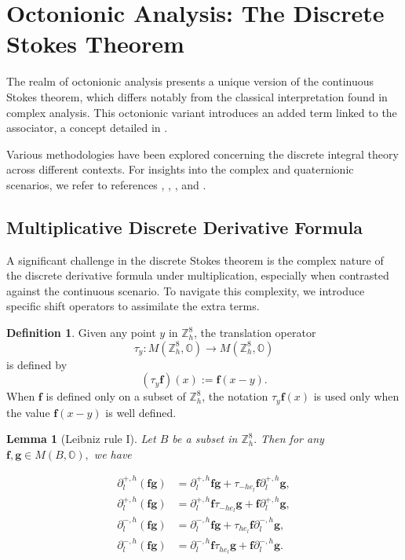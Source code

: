 \documentclass{amsart}
\newtheorem{lemma}[theorem]{Lemma}
\theoremstyle{definition}
\newtheorem{definition}[theorem]{Definition}
\theoremstyle{remark}
\numberwithin{equation}{section}
\newcommand{\p}{\partial}
\newcommand{\OO}{\mathbb O}
\newcommand{\Z}{\mathbb Z}
\newcommand{\f}{\bm{f}}
\newcommand{\g}{\bm{g}}
\begin{document}
 \section{Octonionic Analysis: The Discrete Stokes Theorem}
 The realm of octonionic analysis presents a unique version of the continuous Stokes theorem, which differs notably from the classical interpretation found in complex analysis. This octonionic variant introduces an added term linked to the associator, a concept detailed in \cite{LPT2008}.

 Various methodologies have been explored concerning the discrete integral theory across different contexts. For insights into the complex and quaternionic scenarios, we refer to  references \cite{CS2011}, \cite{CS2012}, \cite{GH2001}, and \cite{RZ2017}.







 \subsection{Multiplicative Discrete Derivative Formula}
 A significant challenge in the discrete Stokes theorem is the complex nature of the discrete derivative formula under multiplication, especially when contrasted against the continuous scenario. To navigate this complexity, we introduce specific shift operators to assimilate the extra terms.

 \begin{definition}
 	Given any point $y$ in $\Z^8_h$, the translation operator
 	\[
 		\tau_y:M(\Z_h^8,\OO)\longrightarrow M(\Z_h^8,\OO)
 	\]
 	is defined by
 	\[
 		(\tau_y\f)(x):=\f(x-y).
 	\]
 	When \(\f\) is defined only on a subset of \(\Z_h^8\), the notation \(\tau_y\f(x)\) is used only when the value \(\f(x-y)\) is well defined.
\end{definition}



\begin{lemma}[Leibniz rule I]
	Let $B$ be a subset in $\Z^8_h.$ Then for any $\f,\g\in M(B,\OO),$ we have
	
	\begin{equation}
		\label{2023-09-06 21:57:31}
		\begin{aligned}
			\p^{+,h}_l(\f \g)&=\p_l^{+,h}\f\g+\tau_{-he_l}\f\p_l^{+,h}\g,\\
			\p^{+,h}_l(\f \g)&= \p^{+,h}_l \f \tau_{-he_l}\g +\f \p_l^{+,h} \g,\\
			\p^{-,h}_l(\f \g)&   = \p_l^{-,h}\f \g+ \tau_{he_l}\f \p_l^{-,h}\g,\\
			\p^{-,h}_l(\f \g)&=\p_l^{-,h}\f \tau_{he_l}\g+\f\p_{l}^{-,h}\g.
		\end{aligned}
	\end{equation}
\end{lemma}
\end{document}
